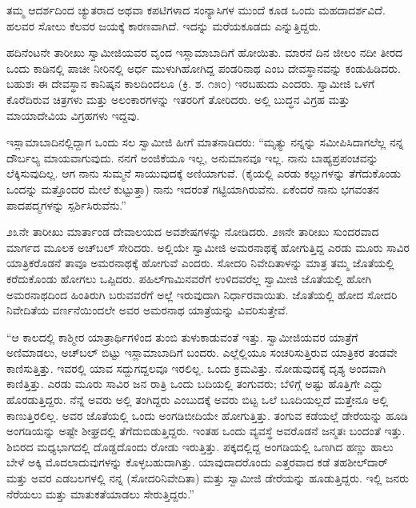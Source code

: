  ತಮ್ಮ ಆದರ್ಶದಿಂದ ಚ್ಯುತರಾದ ಅಥವಾ ಕಪಟಿಗಳಾದ ಸಂನ್ಯಾಸಿಗಳ ಮುಂದೆ ಕೂಡ ಒಂದು ಮಹದಾದರ್ಶವಿದೆ. ಹಲವರ ಸೋಲು ಕೆಲವರ ಜಯಕ್ಕೆ ಕಾರಣವಾಗಿದೆ. ಇದನ್ನು ಮರೆಯಕೂಡದು ಎನ್ನುತ್ತಿದ್ದರು. 

 ಹದಿನೆಂಟನೇ ತಾರೀಖು ಸ್ವಾಮೀಜಿಯವರ ವೃಂದ ಇಸ್ಲಾಮಾಬಾದಿಗೆ ಹೋಯಿತು. ಮಾರನೆ ದಿನ ಜೀಲಂ ನದೀ ತೀರದ ಒಂದು ಕಾಡಿನಲ್ಲಿ ಪಾಚೀ ನೀರಿನಲ್ಲಿ ಅರ್ಧ ಮುಳುಗಿಹೋಗಿದ್ದ ಪಂಡರಿನಾಥ ಎಂಬ ದೇವಸ್ಥಾನವನ್ನು ಕಂಡುಹಿಡಿದರು. ಬಹುಶಃ ಈ ದೇವಸ್ಥಾನ ಕಾನಿಷ್ಕನ ಕಾಲದಿಂದಲೂ (ಕ್ರಿ. ಶ. ೧೫೦) ಇರಬಹುದು ಎಂದರು. ಸ್ವಾಮೀಜಿ ಒಳಗೆ ಕೊರೆದಿರುವ ಚಿತ್ರಗಳು ಮತ್ತು ಅಲಂಕಾರಗಳನ್ನು ಇತರರಿಗೆ ತೋರಿದರು. ಅಲ್ಲಿ ಬುದ್ಧನ ವಿಗ್ರಹ ಮತ್ತು ಮಾಯಾದೇವಿಯ ವಿಗ್ರಹಗಳು ಇದ್ದವು. 

 ಇಸ್ಲಾಮಾಬಾದಿನಲ್ಲಿದ್ದಾಗ ಒಂದು ಸಲ ಸ್ವಾಮೀಜಿ ಹೀಗೆ ಮಾತನಾಡಿದರು: “ಮೃತ್ಯು ನನ್ನನ್ನು ಸಮೀಪಿಸಿದಾಗಲೆಲ್ಲ ನನ್ನ ದೌರ್ಬಲ್ಯ ಮಾಯವಾಗುವುದು. ನನಗೆ ಅಂಜಿಕೆಯೂ ಇಲ್ಲ, ಅನುಮಾನವೂ‌ ಇಲ್ಲ. ನಾನು ಬಾಹ್ಯಪ್ರಪಂಚವನ್ನು ಲೆಕ್ಕಿಸುವುದಿಲ್ಲ. ಆಗ ನಾನು ಸುಮ್ಮನೆ ಸಾಯುವುದಕ್ಕೆ ಅಣಿಯಾಗುವೆ. (ಕೈಯಲ್ಲಿ ಎರಡು ಕಲ್ಲುಗಳನ್ನು ತೆಗೆದುಕೊಂಡು ಒಂದನ್ನು ಮತ್ತೊಂದರ ಮೇಲೆ ಕುಟ್ಟುತ್ತಾ) ನಾನು ಇದರಂತೆ ಗಟ್ಟಿಯಾಗಿರುವೆನು. ಏಕೆಂದರೆ ನಾನು ಭಗವಂತನ ಪಾದಪದ್ಮಗಳನ್ನು ಸ್ಪರ್ಶಿಸಿರುವೆನು.” 

 ೨೩ನೇ ತಾರೀಖು ಮಾರ್ತಾಂಡ ದೇವಾಲಯದ ಅವಶೇಷಗಳನ್ನು ನೋಡಿದರು. ೨೫ನೇ ತಾರೀಖು ಸುಂದರವಾದ ಮಾರ್ಗದ ಮೂಲಕ ಅಚ್‍ಬಲ್ ಸೇರಿದರು. ಅಲ್ಲಿಯೇ ಸ್ವಾಮೀಜಿ ಅಮರನಾಥಕ್ಕೆ ಹೋಗುತ್ತಿದ್ದ ಎರಡು ಮೂರು ಸಾವಿರ ಯಾತ್ರಿಕರೊಡನೆ ತಾವೂ ಅಮರನಾಥಕ್ಕೆ ಹೋಗುವೆ ಎಂದರು. ಸೋದರಿ ನಿವೇದಿತಾಳನ್ನು ಮಾತ್ರ ತಮ್ಮ ಜೊತೆಯಲ್ಲಿ ಕರೆದುಕೊಂಡು ಹೋಗಲು ಒಪ್ಪಿದರು. ಪಹಿಲ್‍ಗಾಮಿನವರೆಗೆ ಉಳಿದವರೆಲ್ಲ ಸ್ವಾಮೀಜಿ ಜೊತೆಯಲ್ಲಿ ಹೋಗಿ ಅಮರನಾಥದಿಂದ ಹಿಂತಿರುಗಿ ಬರುವವರೆಗೆ ಅಲ್ಲೆ ಇರುವುದಾಗಿ ನಿರ್ಧಾರವಾಯಿತು. ಜೊತೆಯಲ್ಲಿ ಹೋದ ಸೋದರಿ ನಿವೇದಿತೆಯ ವರ್ಣನೆಯಿಂದಲೇ ಅವರ ಅಮರನಾಥ ಯಾತ್ರೆಯನ್ನು ವಿವರಿಸುತ್ತೇವೆ. 

 “ಆ ಕಾಲದಲ್ಲಿ ಕಾಶ್ಮೀರ ಯಾತ್ರಾರ್ಥಿಗಳಿಂದ ತುಂಬಿ ತುಳುಕಾಡುವಂತೆ ಇತ್ತು. ಸ್ವಾಮೀಜಿಯವರ ಯಾತ್ರೆಗೆ ಅಣಿಮಾಡಲು, ಅಚ್‍ಬಲ್ ಬಿಟ್ಟು ಇಸ್ಲಾಮಾಬಾದಿಗೆ ಬಂದರು. ಎಲ್ಲೆಲ್ಲಿಯೂ ಸಂಚರಿಸುತ್ತಿರುವ ಯಾತ್ರಿಕರ ತಂಡವೇ ಕಾಣಿಸುತ್ತಿತ್ತು. ಇವರಲ್ಲಿ ಯಾವ ಸದ್ದುಗದ್ದಲವೂ ಇರಲಿಲ್ಲ. ಒಂದು ಕ್ರಮವಿತ್ತು. ನೋಡುವುದಕ್ಕೆ ದೃಶ್ಯ ಅಂದವಾಗಿ ಕಾಣಿತ್ತಿತ್ತು. ಎರಡು ಮೂರು ಸಾವಿರ ಜನ ರಾತ್ರಿ ಒಂದು ಬದಿಯಲ್ಲಿ ತಂಗುವರು; ಬೆಳಿಗ್ಗೆ ಅಷ್ಟು ಹೊತ್ತಿಗೇ ಎದ್ದು ಹೊರಡುತ್ತಿದ್ದರು. ನೆನ್ನೆ ಅವರು ಅಲ್ಲಿ ತಂಗಿದ್ದರು ಎಂಬುದಕ್ಕೆ ಅವರು ಬಿಟ್ಟ ಒಲೆ ಬೂದಿಯಲ್ಲದೆ ಮತ್ತೇನೂ ಅಲ್ಲಿ ಕಾಣುತ್ತಿರಲಿಲ್ಲ. ಅವರ ಜೊತೆಯಲ್ಲಿ ಒಂದು ಅಂಗಡಿಬೀದಿಯೇ ಹೋಗುತ್ತಿತ್ತು. ತಂಗುವ ಕಡೆಯಲ್ಲೆ ಡೇರೆಯನ್ನು ಹೂಡಿ ಅಂಗಡಿಯನ್ನು ಅಷ್ಟೇ ಶೀಘ್ರದಲ್ಲಿ ತೆಗೆದುಬಿಡುತ್ತಿದ್ದರು. ಇಂತಹ ಒಂದು ವ್ಯವಸ್ಥೆ ಅವರೊಡನೆ ಜನ್ಮತಃ ಬಂದಂತೆ ಇತ್ತು. ಶಿಬಿರದ ಮಧ್ಯಭಾಗದಲ್ಲಿ ದೊಡ್ಡದೊಂದು ರೋಡು ಇರುತ್ತಿತ್ತು. ಪಕ್ಕದಲ್ಲಿದ್ದ ಅಂಗಡಿಯಲ್ಲಿ ಒಣಗಿದ ಹಣ್ಣು ಹಾಲು ಬೇಳೆ ಅಕ್ಕಿ ಮೊದಲಾದುವುಗಳನ್ನು ಕೊಳ್ಳಬಹುದಾಗಿತ್ತು. ಯಾವುದಾದರೊಂದು ಎತ್ತರವಾದ ಕಡೆ ತಹಶೀಲ್‍ದಾರ್ ಮತ್ತು ಅವರ ಎಡಬಲಗಳಲ್ಲಿ ನನ್ನ (ಸೋದರಿ\break ನಿವೇದಿತಾ) ಮತ್ತು ಸ್ವಾಮೀಜಿ ಡೇರೆಯನ್ನು ಹೂಡುತ್ತಿದ್ದರು. ಇಲ್ಲಿ ಜನರು ನೆರೆಯಲು ಮತ್ತು ಮಾತುಕತೆಯಾಡಲು ಸೇರುತ್ತಿದ್ದರು.” 

